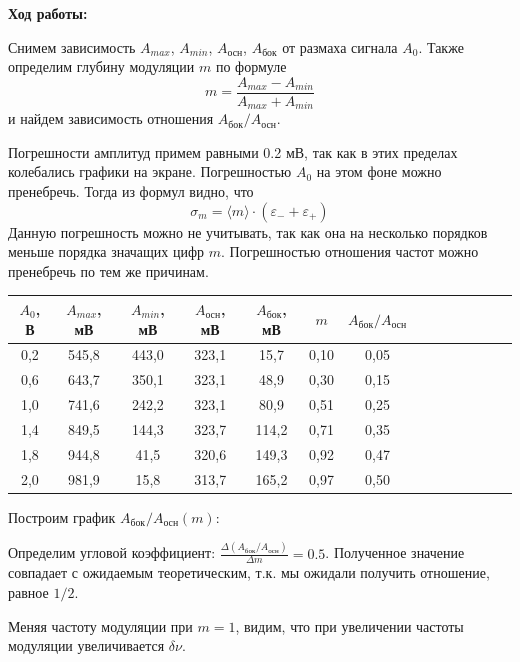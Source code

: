 \documentclass[14pt]{article}
\begin{document}
\vspace{1cm}
\textbf{Ход работы:}

Снимем зависимость $A_{max}$, $A_{min}$, $A_{\text{осн}}$, $A_{\text{бок}}$ от размаха сигнала $A_0$. Также определим глубину модуляции $m$ по формуле
$$
	m = \frac{A_{max} - A_{min}}{A_{max} + A_{min}}
$$
\noindent и найдем зависимость отношения $A_{\text{бок}}/A_{\text{осн}}$.

Погрешности амплитуд примем равными 0.2 мВ, так как в этих пределах колебались графики на экране. Погрешностью $A_0$ на этом фоне можно пренебречь. Тогда из формул видно, что
$$
	\sigma_m = \langle m\rangle\cdot(\varepsilon_- + \varepsilon_+)
$$
Данную погрешность можно не учитывать, так как она на несколько порядков меньше порядка значащих цифр $m$. Погрешностью отношения частот можно пренебречь по тем же причинам.

\begin{center}
\begin{tabular}{|c|c|c|c|c|c|c|c|c|c|c|c|c|c|}
\hline
$A_0$, В&$A_{max}$, мВ&$A_{min}$, мВ&$A_{\text{осн}}$, мВ&$A_{\text{бок}}$, мВ&$m$&$A_{\text{бок}}/A_{\text{осн}}$\\
\hline
0,2&545,8&443,0&323,1&15,7&0,10&0,05\\
\hline
0,6&643,7&350,1&323,1&48,9&0,30&0,15\\
\hline
1,0&741,6&242,2&323,1&80,9&0,51&0,25\\
\hline
1,4&849,5&144,3&323,7&114,2&0,71&0,35\\
\hline
1,8&944,8&41,5&320,6&149,3&0,92&0,47\\
\hline
2,0&981,9&15,8&313,7&165,2&0,97&0,50\\
\hline
\end{tabular}
\end{center}

\vspace{1cm}
Построим график $A_{\text{бок}}/A_{\text{осн}}(m)$:

\vspace{1cm}

\vspace{1cm}
Определим угловой коэффициент: $\frac{\Delta(A_{\text{бок}}/A_{\text{осн}})}{\Delta m} = 0.5$. Полученное значение совпадает с ожидаемым теоретическим, т.к. мы ожидали получить отношение, равное $1/2$.

Меняя частоту модуляции при $m = 1$, видим, что при увеличении частоты модуляции увеличивается $\delta\nu$. 
\end{document}
